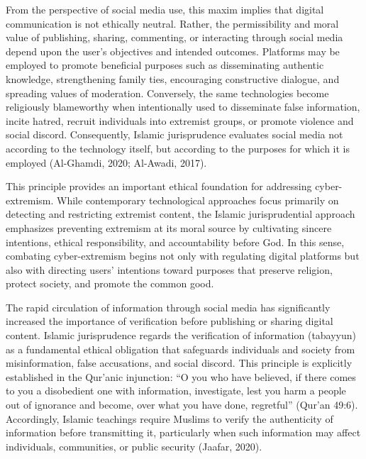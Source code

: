 \documentclass[10pt]{NSP1}
\begin{document}
From the perspective of social media use, this maxim implies that digital communication is not ethically neutral. Rather, the permissibility and moral value of publishing, sharing, commenting, or interacting through social media depend upon the user's objectives and intended outcomes. Platforms may be employed to promote beneficial purposes such as disseminating authentic knowledge, strengthening family ties, encouraging constructive dialogue, and spreading values of moderation. Conversely, the same technologies become religiously blameworthy when intentionally used to disseminate false information, incite hatred, recruit individuals into extremist groups, or promote violence and social discord. Consequently, Islamic jurisprudence evaluates social media not according to the technology itself, but according to the purposes for which it is employed (Al-Ghamdi, 2020; Al-Awadi, 2017).

This principle provides an important ethical foundation for addressing cyber-extremism. While contemporary technological approaches focus primarily on detecting and restricting extremist content, the Islamic jurisprudential approach emphasizes preventing extremism at its moral source by cultivating sincere intentions, ethical responsibility, and accountability before God. In this sense, combating cyber-extremism begins not only with regulating digital platforms but also with directing users' intentions toward purposes that preserve religion, protect society, and promote the common good.

\par\medskip{}\smallskip

The rapid circulation of information through social media has significantly increased the importance of verification before publishing or sharing digital content. Islamic jurisprudence regards the verification of information (tabayyun) as a fundamental ethical obligation that safeguards individuals and society from misinformation, false accusations, and social discord. This principle is explicitly established in the Qur'anic injunction: “O you who have believed, if there comes to you a disobedient one with information, investigate, lest you harm a people out of ignorance and become, over what you have done, regretful” (Qur'an 49:6). Accordingly, Islamic teachings require Muslims to verify the authenticity of information before transmitting it, particularly when such information may affect individuals, communities, or public security (Jaafar, 2020).
\end{document}
